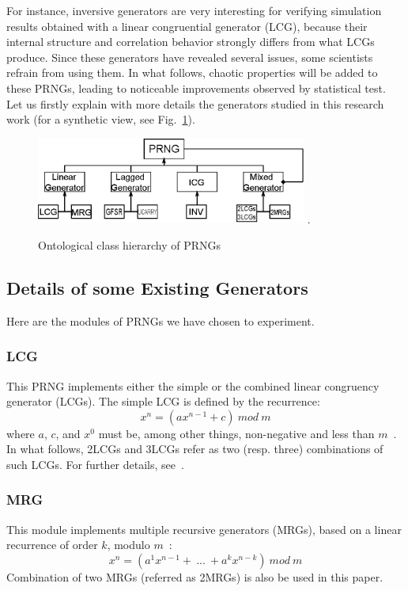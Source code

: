 \documentclass[10pt, conference, compsocconf]{IEEEtran}
\begin{document}
For instance, inversive generators are very interesting for verifying simulation results obtained with a linear congruential generator (LCG),
because their internal structure and correlation behavior strongly differs from what LCGs produce.
Since these generators have revealed several issues, some scientists refrain from using them.
In what follows, chaotic properties will be added to these PRNGs, leading to noticeable improvements observed by statistical test.
Let us firstly explain with more details the generators studied in this research work (for a synthetic view, see Fig.~\ref{Ontological class hierarchy of RNGs}).

\begin{figure}
\centering
\includegraphics[width=3.5in]{TYPEPRNG.eps}
\DeclareGraphicsExtensions.
\caption{Ontological class hierarchy of PRNGs}
\label{Ontological class hierarchy of RNGs}
\end{figure}

\subsection{Details of some Existing Generators}

Here are the modules of PRNGs we have chosen to experiment.

\subsubsection{LCG}
This PRNG implements either the simple or the combined linear congruency generator (LCGs). The simple LCG is defined by the recurrence:
\begin{equation}
x^n = (ax^{n-1} + c)~mod~m
\label{LCG}
\end{equation}
where $a$, $c$, and $x^0$ must be, among other things, non-negative and less than $m$~\cite{testU01}. In what follows, 2LCGs and 3LCGs refer as two (resp. three) combinations of such LCGs.
For further details, see~\cite{combined_lcg}.

\subsubsection{MRG}
This module implements multiple recursive generators (MRGs), based on a linear recurrence of order $k$, modulo $m$~\cite{testU01}:
\begin{equation}
x^n = (a^1x^{n-1}+~...~+a^kx^{n-k})~mod~m
\label{MRG}
\end{equation}
Combination of two MRGs (referred as 2MRGs) is also be used in this paper.
\end{document}
